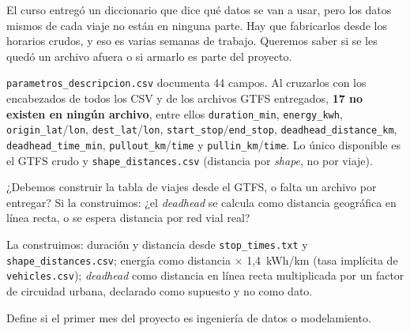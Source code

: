 \documentclass[11pt,a4paper,parskip=half]{scrartcl}
\begin{document}
\begin{campos}
\item[En simple] El curso entregó un diccionario que dice qué datos se van a usar, pero los datos mismos de cada viaje no están en ninguna parte. Hay que fabricarlos desde los horarios crudos, y eso es varias semanas de trabajo. Queremos saber si se les quedó un archivo afuera o si armarlo es parte del proyecto.
\item[Evidencia] \texttt{parametros\_descripcion.csv} documenta 44 campos. Al cruzarlos con los encabezados de todos los CSV y de los archivos GTFS entregados, \textbf{17 no existen en ningún archivo}, entre ellos \texttt{duration\_min}, \texttt{energy\_kwh}, \texttt{origin\_lat}/\texttt{lon}, \texttt{dest\_lat}/\texttt{lon}, \texttt{start\_stop}/\texttt{end\_stop}, \texttt{deadhead\_distance\_km}, \texttt{deadhead\_time\_min}, \texttt{pullout\_km}/\texttt{time} y \texttt{pullin\_km}/\texttt{time}. Lo único disponible es el GTFS crudo y \texttt{shape\_distances.csv} (distancia por \textit{shape}, no por viaje).
\item[Pregunta] ¿Debemos construir la tabla de viajes desde el GTFS, o falta un archivo por entregar? Si la construimos: ¿el \textit{deadhead} se calcula como distancia geográfica en línea recta, o se espera distancia por red vial real?
\item[Supuesto] La construimos: duración y distancia desde \texttt{stop\_times.txt} y \texttt{shape\_distances.csv}; energía como distancia $\times$ 1{,}4~kWh/km (tasa implícita de \texttt{vehicles.csv}); \textit{deadhead} como distancia en línea recta multiplicada por un factor de circuidad urbana, declarado como supuesto y no como dato.
\item[Impacto] Define si el primer mes del proyecto es ingeniería de datos o modelamiento.
\end{campos}
\end{document}
